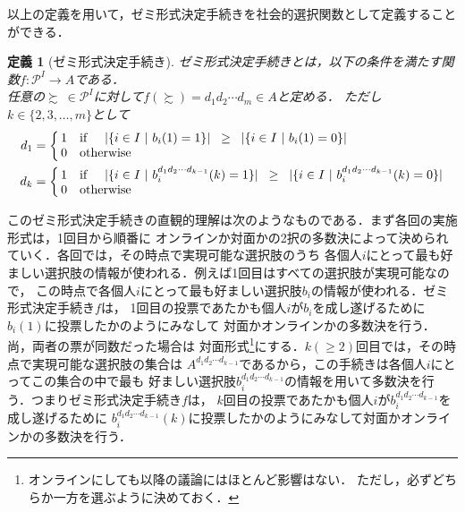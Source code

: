\documentclass[dvipdfmx]{jsarticle}
\newtheorem{definition}{定義}
\begin{document}
以上の定義を用いて，ゼミ形式決定手続きを社会的選択関数として定義することができる．
\begin{definition}[ゼミ形式決定手続き]\label{def:ゼミ形式決定手続き}
  ゼミ形式決定手続きとは，以下の条件を満たす関数$f\colon \mathcal{P}^I \to A$である．\\
  任意の$\succsim \ \in \mathcal{P}^I$に対して$f(\succsim) = d_{1}d_{2}\cdots d_{m} \in A$と定める．
  ただし$k \in \{2,3,\ldots,m\}$として
  \begin{align*}
      d_{1}
    &= \left\{ \begin{array}{@{\,}rl@{}}
      1 & \textup{if}\hspace{5mm}  |\{i \in I\ |\ b_i(1) = 1\}| \hspace{2mm} \geq \hspace{2mm} |\{i \in I\ |\ b_i(1) = 0\}| \\
      0 & \textup{otherwise}
    \end{array} \right. \\
      d_{k}
    &= \left\{ \begin{array}{@{\,}rl@{}}
      1 & \textup{if}\hspace{5mm}  |\{i \in I\ |\ b_i^{d_{1}d_{2}\cdots d_{k-1}}(k) = 1\}| \hspace{2mm}
      \geq \hspace{2mm} |\{i \in I\ |\ b_i^{d_{1}d_{2}\cdots d_{k-1}}(k) = 0\}| \\
      0 & \textup{otherwise}
    \end{array} \right.
  \end{align*}
\end{definition}

\noindent{}このゼミ形式決定手続きの直観的理解は次のようなものである．まず各回の実施形式は，1回目から順番に
オンラインか対面かの2択の多数決によって決められていく．各回では，その時点で実現可能な選択肢のうち
各個人$i$にとって最も好ましい選択肢の情報が使われる．例えば1回目はすべての選択肢が実現可能なので，
この時点で各個人$i$にとって最も好ましい選択肢$b_i$の情報が使われる．ゼミ形式決定手続き$f$は，
1回目の投票であたかも個人$i$が$b_i$を成し遂げるために$b_{i}(1)$に投票したかのようにみなして
対面かオンラインかの多数決を行う．尚，両者の票が同数だった場合は
対面形式\footnote{オンラインにしても以降の議論にはほとんど影響はない．
ただし，必ずどちらか一方を選ぶように決めておく．}にする．$k(\geq 2)$回目では，その時点で実現可能な選択肢の集合は
$A^{d_{1}d_{2}\cdots d_{k-1}}$であるから，この手続きは各個人$i$にとってこの集合の中で最も
好ましい選択肢$b_i^{d_{1}d_{2}\cdots d_{k-1}}$の情報を用いて多数決を行う．つまりゼミ形式決定手続き$f$は，
$k$回目の投票であたかも個人$i$が$b_i^{d_{1}d_{2}\cdots d_{k-1}}$を成し遂げるために
$b_i^{d_{1}d_{2}\cdots d_{k-1}}(k)$に投票したかのようにみなして対面かオンラインかの多数決を行う．
\end{document}
